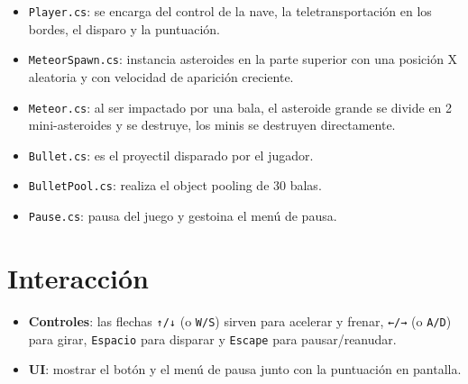 \documentclass[12pt,twoside,letterpaper]{article}
\begin{document}
\begin{itemize}
    \item \texttt{Player.cs}: se encarga del control de la nave, la teletransportación en los bordes, el disparo y la puntuación.
    \item \texttt{MeteorSpawn.cs}: instancia asteroides en la parte superior con una posición X aleatoria y con velocidad de aparición creciente.
    \item \texttt{Meteor.cs}: al ser impactado por una bala, el asteroide grande se divide en 2 mini-asteroides y se destruye, los minis se destruyen directamente.
    \item \texttt{Bullet.cs}: es el proyectil disparado por el jugador.
    \item \texttt{BulletPool.cs}: realiza el object pooling de 30 balas. 
    \item \texttt{Pause.cs}: pausa del juego y gestoina el menú de pausa.
\end{itemize}

\section{Interacción}

\begin{itemize}
    \item \textbf{Controles}: las flechas \texttt{↑/↓} (o \texttt{W/S}) sirven para acelerar y frenar, \texttt{←/→} (o \texttt{A/D}) para girar, \texttt{Espacio} para disparar y \texttt{Escape} para pausar/reanudar.
    \item \textbf{UI}: mostrar el botón y el menú de pausa junto con la  puntuación en pantalla.
\end{itemize}
\end{document}
